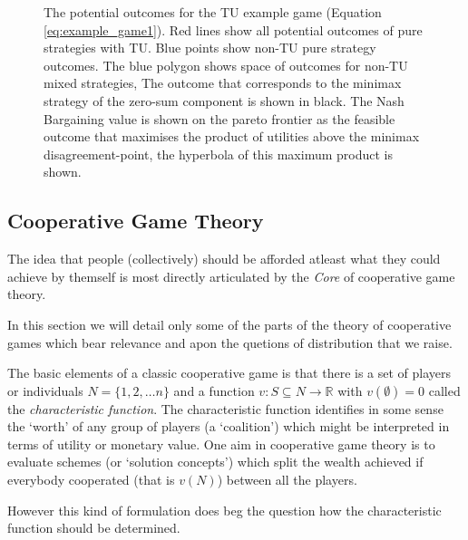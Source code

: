 \begin{figure}[tb]
\begin{tikzpicture}[line cap=round,line join=round,>=triangle 45,x=1cm,y=1cm]
\end{tikzpicture}
\caption[Utility diagram for example game.]{The potential outcomes for the TU example game (Equation \ref{eq:example_game1}). Red lines show all potential outcomes of pure strategies with TU. Blue points show non-TU pure strategy outcomes. The blue polygon shows space of outcomes for non-TU mixed strategies, The outcome that corresponds to the minimax strategy of the zero-sum component is shown in black. The Nash Bargaining value is shown on the pareto frontier as the feasible outcome that maximises the product of utilities above the minimax disagreement-point, the hyperbola of this maximum product is shown.}
\label{fig:graph1_utilities}
\end{figure}



\subsection{Cooperative Game Theory}\label{sec:cooperative_game_theory_part}

The idea that people (collectively) should be afforded atleast what they could achieve by themself is most directly articulated by the \textit{Core} of cooperative game theory.

In this section we will detail only some of the parts of the theory of cooperative games which bear relevance and apon the quetions of distribution that we raise.

The basic elements of a classic cooperative game is that there is a set of players or individuals $N=\{1,2,\dots n\}$ and a function $v: S\subseteq N \rightarrow \mathbb{R}$ with $v(\emptyset)=0$ called the \textit{characteristic function}.
The characteristic function identifies in some sense the `worth' of any group of players (a `coalition') which might be interpreted in terms of utility or monetary value.
One aim in cooperative game theory is to evaluate schemes (or `solution concepts') which split the wealth achieved if everybody cooperated (that is $v(N)$) between all the players.

However this kind of formulation does beg the question how the characteristic function should be determined.

